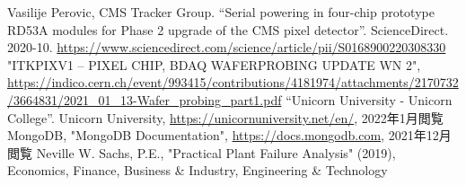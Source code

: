 \begin{thebibliography}{24}
Vasilije Perovic, CMS Tracker Group. “Serial powering in four-chip prototype RD53A modules for Phase 2 upgrade of the CMS pixel detector”. ScienceDirect. 2020-10. \url{https://www.sciencedirect.com/science/article/pii/S0168900220308330}
"ITKPIXV1 – PIXEL CHIP, BDAQ WAFERPROBING UPDATE WN 2", \url{https://indico.cern.ch/event/993415/contributions/4181974/attachments/2170732/3664831/2021_01_13-Wafer_probing_part1.pdf}
“Unicorn University - Unicorn College”. Unicorn University, \url{https://unicornuniversity.net/en/}, 2022年1月閲覧
MongoDB, "MongoDB Documentation", \url{https://docs.mongodb.com}, 2021年12月閲覧
Neville W. Sachs, P.E., "Practical Plant Failure Analysis" (2019), Economics, Finance, Business \& Industry, Engineering \& Technology
\end{thebibliography}
